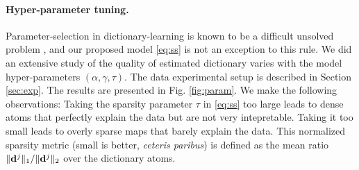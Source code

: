 \paragraph{Hyper-parameter tuning.}
Parameter-selection in dictionary-learning is known to be a difficult unsolved
problem   \citep{mairal2010,jenatton2010structured}, and our proposed model \eqref{eq:ss} is not an exception to this rule. We did an extensive study of the quality of estimated dictionary varies with the model hyper-parameters $(\alpha,\gamma,\tau)$. The data experimental setup is described in Section \ref{sec:exp}.
The results are presented in Fig. \ref{fig:param}.
We make the following observations:
Taking the sparsity parameter $\tau$ in \eqref{eq:ss} too large leads to dense atoms that perfectly explain the data but are not very intepretable. Taking it too small leads to overly sparse maps that barely explain the data. This normalized sparsity metric (small is better, \textit{ceteris paribus}) is defined as the mean ratio $\|\mathbf{d}^j\|_1 / \|\mathbf{d}^j\|_2$ over the dictionary atoms. %
